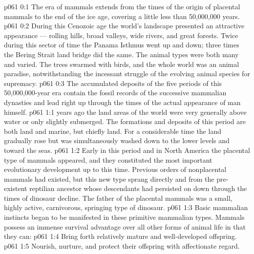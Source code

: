 \author{Life Carrier}
\vs p061 0:1 The era of mammals extends from the times of the origin of placental mammals to the end of the ice age, covering a little less than 50,000,000 years.
\vs p061 0:2 During this Cenozoic age the world’s landscape presented an attractive appearance --- rolling hills, broad valleys, wide rivers, and great forests. Twice during this sector of time the Panama Isthmus went up and down; three times the Bering Strait land bridge did the same. The animal types were both many and varied. The trees swarmed with birds, and the whole world was an animal paradise, notwithstanding the incessant struggle of the evolving animal species for supremacy.
\vs p061 0:3 The accumulated deposits of the five periods of this 50,000,000\hyp{}year era contain the fossil records of the successive mammalian dynasties and lead right up through the times of the actual appearance of man himself.
\vs p061 1:1  years ago the land areas of the world were very generally above water or only slightly submerged. The formations and deposits of this period are both land and marine, but chiefly land. For a considerable time the land gradually rose but was simultaneously washed down to the lower levels and toward the seas.
\vs p061 1:2 Early in this period and in North America the placental type of mammals  appeared, and they constituted the most important evolutionary development up to this time. Previous orders of nonplacental mammals had existed, but this new type sprang directly and  from the pre\hyp{}existent reptilian ancestor whose descendants had persisted on down through the times of dinosaur decline. The father of the placental mammals was a small, highly active, carnivorous, springing type of dinosaur.
\vs p061 1:3 Basic mammalian instincts began to be manifested in these primitive mammalian types. Mammals possess an immense survival advantage over all other forms of animal life in that they can:
\vs p061 1:4 \bibnobreakspace Bring forth relatively mature and well\hyp{}developed offspring.
\vs p061 1:5 \bibnobreakspace Nourish, nurture, and protect their offspring with affectionate regard.
